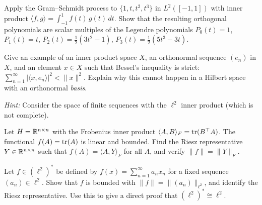 \documentclass[11pt,a4paper]{article}
\begin{document}
\begin{exercise}
\label{ex:legendre}
Apply the Gram--Schmidt process to $\{1, t, t^2, t^3\}$ in
$L^2([-1,1])$ with inner product
$\langle f, g \rangle = \int_{-1}^1 f(t)\, g(t)\, dt$. Show that the
resulting orthogonal polynomials are scalar multiples of the Legendre
polynomials $P_0(t) = 1$, $P_1(t) = t$,
$P_2(t) = \frac{1}{2}(3t^2 - 1)$,
$P_3(t) = \frac{1}{2}(5t^3 - 3t)$.
\end{exercise}

\begin{exercise}
\label{ex:bessel-tight}
Give an example of an inner product space $X$, an orthonormal sequence
$(e_n)$ in $X$, and an element $x \in X$ such that Bessel's inequality
is strict:
$\sum_{n=1}^\infty |\langle x, e_n \rangle|^2 < \|x\|^2$. Explain why
this cannot happen in a Hilbert space with an orthonormal \emph{basis}.

\noindent\textit{Hint:} Consider the space of finite sequences with the
$\ell^2$ inner product (which is not complete).
\end{exercise}

\begin{exercise}
\label{ex:riesz-trace}
Let $H = \mathbb{R}^{n \times n}$ with the Frobenius inner product
$\langle A, B \rangle_F = \operatorname{tr}(B^\top A)$. The functional
$f(A) = \operatorname{tr}(A)$ is linear and bounded. Find the Riesz representative
$Y \in \mathbb{R}^{n \times n}$ such that $f(A) = \langle A, Y \rangle_F$ for
all $A$, and verify $\|f\| = \|Y\|_F$.
\end{exercise}

\begin{exercise}
\label{ex:dual-ell2}
Let $f \in (\ell^2)^*$ be defined by $f(x) = \sum_{n=1}^\infty a_n x_n$
for a fixed sequence $(a_n) \in \ell^2$. Show that $f$ is bounded with
$\|f\| = \|(a_n)\|_{\ell^2}$, and identify the Riesz representative.
Use this to give a direct proof that $(\ell^2)^* \cong \ell^2$.
\end{exercise}
\end{document}
